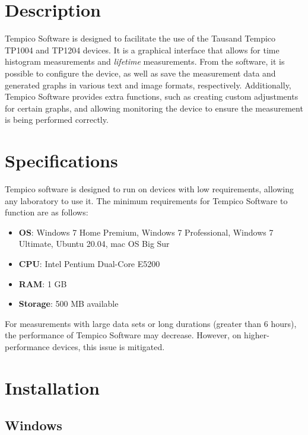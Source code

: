 \documentclass[
]{article}
\begin{document}
\hypertarget{description}{%
\section{Description}\label{description}}

Tempico Software is designed to facilitate the use of the Tausand
Tempico TP1004 and TP1204 devices. It is a graphical interface that
allows for time histogram measurements and \emph{lifetime} measurements.
From the software, it is possible to configure the device, as well as
save the measurement data and generated graphs in various text and image
formats, respectively. Additionally, Tempico Software provides extra
functions, such as creating custom adjustments for certain graphs, and
allowing monitoring the device to ensure the measurement is being
performed correctly.

\hypertarget{specifications}{%
\section{Specifications}\label{specifications}}

Tempico software is designed to run on devices with low requirements,
allowing any laboratory to use it. The minimum requirements for Tempico
Software to function are as follows:

\begin{itemize}
\item
  \textbf{OS}: Windows 7 Home Premium, Windows 7 Professional, Windows 7
  Ultimate, Ubuntu 20.04, mac OS Big Sur
\item
  \textbf{CPU}: Intel Pentium Dual-Core E5200
\item
  \textbf{RAM}: 1 GB
\item
  \textbf{Storage}: 500 MB available
\end{itemize}

For measurements with large data sets or long durations (greater than 6
hours), the performance of Tempico Software may decrease. However, on
higher-performance devices, this issue is mitigated.

\hypertarget{installation}{%
\section{Installation}\label{installation}}

\hypertarget{windows}{%
\subsection{Windows}\label{windows}}
\end{document}
